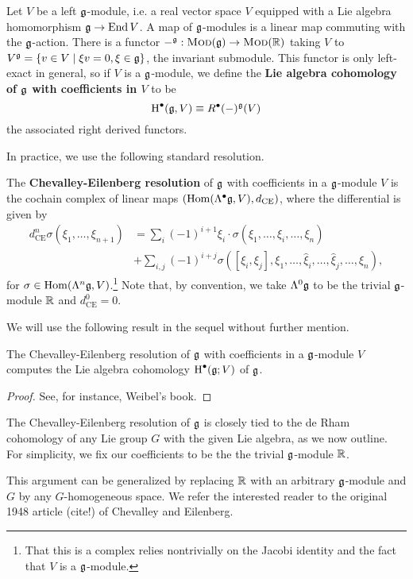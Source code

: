 \documentclass{amsart}
\begin{document}
\begin{definition}
    Let $V$ be a left $\mathfrak g$-module, i.e. a real vector space $V$ equipped with a Lie algebra
    homomorphism $\mathfrak g\to \operatorname{End} V$. A map of $\mathfrak g$-modules is a linear map commuting with
    the $\mathfrak g$-action. There is a functor $-^\mathfrak g:\textsc{Mod}(\mathfrak g)\to \textsc{Mod}(\mathbb{R})$ taking
    $V$ to $V^\mathfrak g=\{v\in V \mid \xi v=0, \xi\in\mathfrak g\}$, the invariant submodule. This functor
    is only left-exact in general, so if $V$ is a $\mathfrak g$-module, we define the
    \textbf{Lie algebra cohomology of $\mathfrak g$ with coefficients in $V$} to be
    \begin{equation*}
        \operatorname{H}^\bullet(\mathfrak g, V) \equiv R^\bullet(-)^{\mathfrak g}(V)
    \end{equation*}
    the associated right derived functors.
\end{definition}

In practice, we use the following standard resolution.
\begin{definition}
    The \textbf{Chevalley-Eilenberg resolution} of $\mathfrak g$ with coefficients in a $\mathfrak g$-module
    $V$ is the cochain complex of linear maps $(\operatorname{Hom}(\Lambda^\bullet\mathfrak g,V),d_\textrm{CE})$,
    where the differential is given by
    \begin{align*}
        d_\textrm{CE}^n\sigma(\xi_1,\ldots,\xi_{n+1}) &= \sum_i (-1)^{i+1}\xi_i\cdot\sigma(\xi_1,\ldots,\hat\xi_i,\ldots,\xi_n)\\
        &+\sum_{i,j}(-1)^{i+j}\sigma([\xi_i,\xi_j],\xi_1,\ldots,\hat \xi_i,\ldots,\hat \xi_j,\ldots,\xi_n),
    \end{align*}
    for $\sigma\in\operatorname{Hom}(\Lambda^n\mathfrak g,V)$.\footnote{That this is a complex relies nontrivially
    on the Jacobi identity and the fact that $V$ is a $\mathfrak g$-module.}
    Note that, by convention, we take $\Lambda^0\mathfrak g$ to be the trivial $\mathfrak g$-module $\mathbb{R}$
    and $d^0_\textrm{CE}=0$.
\end{definition}

We will use the following result in the sequel without further mention.
\begin{theorem}
    The Chevalley-Eilenberg resolution of $\mathfrak g$ with coefficients in a $\mathfrak g$-module
    $V$ computes the Lie algebra cohomology $\operatorname{H}^\bullet(\mathfrak g;V)$ of $\mathfrak g$.
\end{theorem}
\begin{proof}
    See, for instance, Weibel's book.
\end{proof}

\begin{remark}
    The Chevalley-Eilenberg resolution of $\mathfrak g$ is closely tied to the de Rham cohomology of
    any Lie group $G$ with the given Lie algebra, as we now outline. For simplicity, we fix our
    coefficients to be the the trivial $\mathfrak g$-module $\mathbb{R}$. 

    This argument can be generalized by replacing $\mathbb{R}$ with an arbitrary $\mathfrak g$-module
    and $G$ by any $G$-homogeneous space. We refer the interested reader to the original
    1948 article (cite!) of Chevalley and Eilenberg.
\end{remark}
\end{document}
